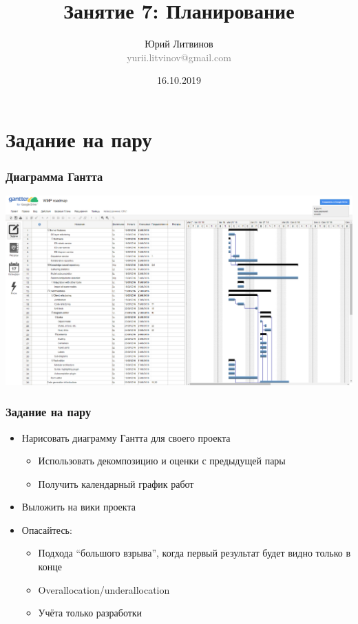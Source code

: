 \documentclass[xetex,mathserif,serif]{beamer}
\title{Занятие 7: Планирование}
\author[Юрий Литвинов]{Юрий Литвинов\\\small{\textcolor{gray}{yurii.litvinov@gmail.com}}}
\date{16.10.2019}
\begin{document}
	\frame{\titlepage}

	\section{Задание на пару}

	\begin{frame}
		\frametitle{Диаграмма Гантта}
		\begin{center}
			\includegraphics[width=\textwidth]{gantter.png}
		\end{center}
	\end{frame}

	\begin{frame}
		\frametitle{Задание на пару}
		\begin{itemize}
			\item Нарисовать диаграмму Гантта для своего проекта
			\begin{itemize}
				\item Использовать декомпозицию и оценки с предыдущей пары
				\item Получить календарный график работ
			\end{itemize}
			\item Выложить на вики проекта
			\item Опасайтесь:
			\begin{itemize}
				\item Подхода ``большого взрыва'', когда первый результат будет видно только в конце
				\item Overallocation/underallocation
				\item Учёта только разработки
			\end{itemize}
		\end{itemize}
	\end{frame}
\end{document}
